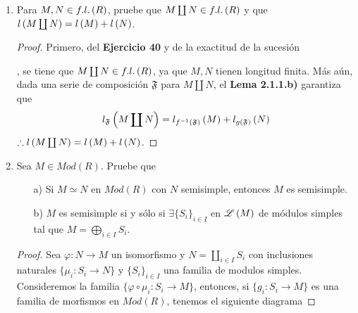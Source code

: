 \documentclass{article}
\begin{document}
\begin{enumerate}[label=\textbf{Ej \arabic*.}]
\begin{proof}
			\begin{align*}
				a&\in f^{-1}\lrprth{C_k}, && \lrprth{\ref{stblinK}}\\
				&\implies f(a)\in C_k\\
				&\implies m-b\in C_k\\
				&\implies m\in C_k, && b\in C_k.\\
				\implies & C_t\leq C_k.
			\end{align*}
			Por lo tanto $M$ es artiniano.\\
		\end{proof}
		\item %
		Para $M,N \in f.l.\left(R\right)$, pruebe que $M \coprod N \in f.l.\left(R\right)$ y que $l\left(M \coprod N\right)=l\left(M\right)+l\left(N\right)$.
		\begin{proof}
			Primero, del \textbf{Ejercicio 40} y de la exactitud de la sucesión
			, se tiene que $M \coprod N \in f.l.\left(R\right)$, ya que $M,N$ tienen longitud finita. Más aún, dada una serie de composición $\mathfrak{F}$ para $M \coprod N$, el \textbf{Lema 2.1.1.b)} garantiza que 
			\begin{align*}
				l_{\mathfrak{F}}\left(M \coprod N\right)=l_{f^{-1}\left(\mathfrak{F}\right)}\left(M\right)+l_{g\left(\mathfrak{F}\right)}\left(N\right)
			\end{align*}
			$\therefore l\left(M \coprod N\right)=l\left(M\right)+l\left(N\right)$.
		\end{proof}
		
		
		\item Sea $M\in Mod(R)$. Pruebe que 
		\begin{itemize}
			\item[a)] Si $M\simeq N$ en $Mod(R)$ con $N$ semisimple, entonces $M$ es semisimple.
			
			\item[b)] $M$ es semisimple si y sólo si $\exists\{S_i\}_{i\in I}$ en $\mathscr{L}\left(M\right)$ de módulos simples tal que $M=\displaystyle\bigoplus_{i\in I}S_i$.
			
		\end{itemize}
		\begin{proof}
			 Sea $\varphi \colon N\longrightarrow M$ un isomorfismo y $N=\displaystyle\coprod_{i\in I}S_i$ con inclusiones naturales 
			$\{\mu_i\colon S_i\longrightarrow N\}$ y $\{S_i\}_{i\in I}$ una familia de modulos simples.\\
			Consideremos la familia $\{\varphi\circ \mu_i\colon S_i\longrightarrow M\}$, entonces, si $\{g_i\colon S_i\longrightarrow M\}$ es una 
			familia de morfismos en $Mod(R)$, tenemos el siguiente diagrama
			

\end{proof}
\end{enumerate}
\end{document}

